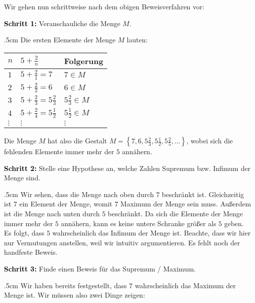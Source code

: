 \documentclass[fontsize=9pt,
               parskip=half-,
               DIV=14,
               listof=chapterentry,
               tocflat]{scrbook}
\newenvironment{indentblock}{\begin{adjustwidth}{.5cm}{}}{\end{adjustwidth}}
\newcommand{\proofstep}[1]{\textbf{\textcolor{Black}{#1}}}
\begin{document}
\begin{solutionprocess*}
Wir gehen nun schrittweise nach dem obigen Beweisverfahren vor:

\proofstep{Schritt 1:}
 Veranschauliche die Menge $M$.\begin{indentblock}
Die ersten Elemente der Menge $M$ lauten:


\renewcommand{\arraystretch}{1.5}

\begin{longtabu} to \linewidth {X[l]X[l]X[l]} \\ \toprule 
$n$ & $5+{\tfrac {2}{n}}$ & Folgerung \\ 
\midrule
$1$ & $5+{\tfrac {2}{1}}=7$ & $7\in M$ \\ 
$2$ & $5+{\tfrac {2}{2}}=6$ & $6\in M$ \\ 
$3$ & $5+{\tfrac {2}{3}}=5{\tfrac {2}{3}}$ & $5{\tfrac {2}{3}}\in M$ \\ 
$4$ & $5+{\tfrac {2}{4}}=5{\tfrac {1}{2}}$ & $5{\tfrac {1}{2}}\in M$ \\ 
$\vdots $ & $\vdots $ & $\vdots $ \\ 
\bottomrule
\end{longtabu}
\renewcommand{\arraystretch}{1.0}
Die Menge $M$ hat also die Gestalt $M=\left\{7,6,5{\tfrac {2}{3}},5{\tfrac {1}{2}},5{\tfrac {2}{5}},\dots \right\}$, wobei sich die fehlenden Elemente immer mehr der $5$ annähern.

\end{indentblock}

\proofstep{Schritt 2:}
 Stelle eine Hypothese an, welche Zahlen Supremum bzw. Infimum der Menge sind.\begin{indentblock}
Wir sehen, dass die Menge nach oben durch $7$ beschränkt ist. Gleichzeitig ist $7$ ein Element der Menge, womit $7$ Maximum der Menge sein muss. Außerdem ist die Menge nach unten durch $5$ beschränkt. Da sich die Elemente der Menge immer mehr der $5$ annähern, kann es keine untere Schranke größer als $5$ geben. Es folgt, dass $5$ wahrscheinlich das Infimum der Menge ist. Beachte, dass wir hier nur Vermutungen anstellen, weil wir intuitiv argumentieren. Es fehlt noch der handfeste Beweis.

\end{indentblock}

\proofstep{Schritt 3:}
 Finde einen Beweis für das Supremum / Maximum.\begin{indentblock}
Wir haben bereits festgestellt, dass $7$ wahrscheinlich das Maximum der Menge ist. Wir müssen also zwei Dinge zeigen:


\end{indentblock}
\end{solutionprocess*}
\end{document}
